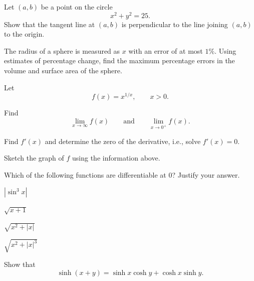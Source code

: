 \begin{problem}
\begin{problemsubparts}
\item Let $(a, b)$ be a point on the circle
\[
x^2+y^2=25.
\]
Show that the tangent line at $(a, b)$ is perpendicular to the line joining $(a, b)$ to the origin.
\item The radius of a sphere is measured as $x$ with an error of at most $1\%$. Using estimates of percentage change, find the maximum percentage errors in the volume and surface area of the sphere.
\end{problemsubparts}
\end{problem}

\begin{problem}
Let
\[
f(x)=x^{1/x},
\qquad x>0.
\]
\begin{problemsubparts}
\item Find
\[
\lim_{x\to\infty}f(x)
\qquad\text{and}\qquad
\lim_{x\to0^+}f(x).
\]
\item Find $f'(x)$ and determine the zero of the derivative, i.e., solve $f'(x)=0$.
\item Sketch the graph of $f$ using the information above.
\end{problemsubparts}
\end{problem}

\begin{problem}
\begin{problemsubparts}
\item Which of the following functions are differentiable at $0$? Justify your answer.
\begin{problemchoices}
\item $|\sin^3 x|$
\item $\sqrt{x+1}$
\item $\sqrt{x^2+|x|}$
\item $\sqrt{x^2+|x|^3}$
\end{problemchoices}
\item Show that
\[
\sinh(x+y)=\sinh x\cosh y+\cosh x\sinh y.
\]
\end{problemsubparts}
\end{problem}

